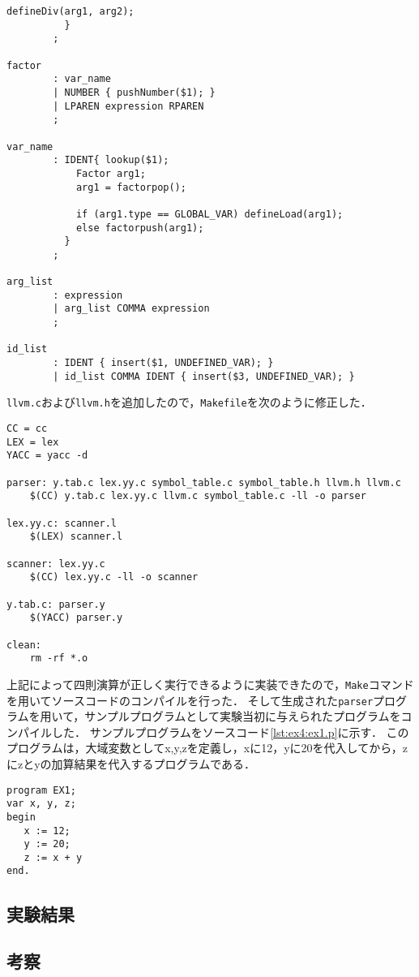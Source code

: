 \documentclass[uplatex]{jsarticle}
\begin{document}
\begin{lstlisting}[caption=構文規則部の処理,label=lst:ex4:parser.y:rules]
            defineDiv(arg1, arg2);
          }
        ;

factor
        : var_name
        | NUMBER { pushNumber($1); }
        | LPAREN expression RPAREN
        ;

var_name
        : IDENT{ lookup($1);
            Factor arg1;
            arg1 = factorpop();

            if (arg1.type == GLOBAL_VAR) defineLoad(arg1);
            else factorpush(arg1);
          }
        ;

arg_list
        : expression
        | arg_list COMMA expression
        ;

id_list
        : IDENT { insert($1, UNDEFINED_VAR); }
        | id_list COMMA IDENT { insert($3, UNDEFINED_VAR); }
\end{lstlisting}

\verb#llvm.c#および\verb#llvm.h#を追加したので，\verb#Makefile#を次のように修正した．
\begin{lstlisting}[caption=Makefile,label=lst:ex4:Makefile]
CC = cc
LEX = lex
YACC = yacc -d

parser: y.tab.c lex.yy.c symbol_table.c symbol_table.h llvm.h llvm.c
	$(CC) y.tab.c lex.yy.c llvm.c symbol_table.c -ll -o parser

lex.yy.c: scanner.l
	$(LEX) scanner.l

scanner: lex.yy.c
	$(CC) lex.yy.c -ll -o scanner

y.tab.c: parser.y
	$(YACC) parser.y

clean:
	rm -rf *.o
\end{lstlisting}

上記によって四則演算が正しく実行できるように実装できたので，\verb#Make#コマンドを用いてソースコードのコンパイルを行った．
そして生成された\verb#parser#プログラムを用いて，サンプルプログラムとして実験当初に与えられたプログラムをコンパイルした．
サンプルプログラムをソースコード\ref{lst:ex4:ex1.p}に示す．
このプログラムは，大域変数としてx,y,zを定義し，xに12，yに20を代入してから，zにzとyの加算結果を代入するプログラムである．

\begin{lstlisting}[caption=ex1.p,label=lst:ex4:ex1.p]
program EX1;
var x, y, z;
begin
   x := 12;
   y := 20;
   z := x + y
end.
\end{lstlisting}

\subsection{実験結果}



\subsection{考察}
\end{document}
